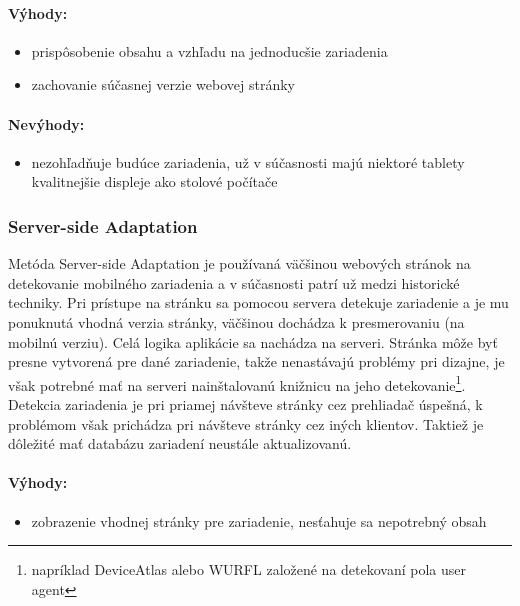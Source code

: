 \paragraph{Výhody:}
\begin{itemize}
	\item prispôsobenie obsahu a vzhľadu na jednoducšie zariadenia
	\item zachovanie súčasnej verzie webovej stránky
\end{itemize}

\paragraph{Nevýhody:}
\begin{itemize}
	\item nezohľadňuje budúce zariadenia, už v súčasnosti majú niektoré tablety kvalitnejšie displeje ako stolové počítače 
\end{itemize}



\subsubsection{Server-side Adaptation} %
\label{ssub:ress_}

Metóda Server-side Adaptation je používaná väčšinou webových stránok na detekovanie mobilného zariadenia a v súčasnosti patrí už medzi historické techniky. Pri prístupe na stránku sa pomocou servera detekuje zariadenie a je mu ponuknutá vhodná verzia stránky, väčšinou dochádza k presmerovaniu (na mobilnú verziu). Celá logika aplikácie sa nachádza na serveri. Stránka môže byť presne vytvorená pre dané zariadenie, takže nenastávajú problémy pri dizajne, je však potrebné mať na serveri nainštalovanú knižnicu na jeho detekovanie\footnote{napríklad DeviceAtlas alebo WURFL založené na detekovaní pola user agent}. Detekcia zariadenia je pri priamej návšteve stránky cez prehliadač úspešná, k problémom však prichádza pri návšteve stránky cez iných klientov. Taktiež je dôležité mať databázu zariadení neustále aktualizovanú.

\paragraph{Výhody:}
\begin{itemize}
	\item zobrazenie vhodnej stránky pre zariadenie, nesťahuje sa nepotrebný obsah
\end{itemize}

